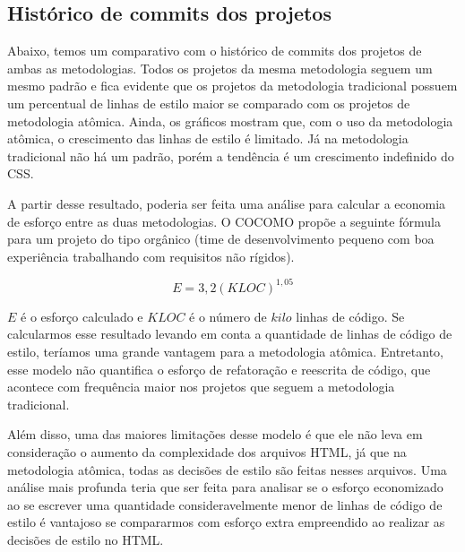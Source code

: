 \hypertarget{porcentagem de estilo}{%
\subsection{Histórico de commits dos projetos}\label{parcel}}

Abaixo, temos um comparativo com o histórico de commits dos projetos de ambas as metodologias. Todos os projetos da mesma metodologia seguem um mesmo padrão e fica evidente que os projetos da metodologia tradicional possuem um percentual de linhas de estilo maior se comparado com os projetos de metodologia atômica. Ainda, os gráficos mostram que, com o uso da metodologia atômica, o crescimento das linhas de estilo é limitado. Já na metodologia tradicional não há um padrão, porém a tendência é um crescimento indefinido do CSS.

A partir desse resultado, poderia ser feita uma análise para calcular a economia de esforço entre as duas metodologias. O COCOMO propõe a seguinte fórmula para um projeto do tipo orgânico (time de desenvolvimento pequeno com boa experiência trabalhando com requisitos não rígidos).

 \[E = 3,2(KLOC)^{1,05}\]

$E$ é o esforço calculado e $KLOC$ é o número de $kilo$ linhas de código. Se calcularmos esse resultado levando em conta a quantidade de linhas de código de estilo, teríamos uma grande vantagem para a metodologia atômica. Entretanto, esse modelo não quantifica o esforço de refatoração e reescrita de código, que acontece com frequência maior nos projetos que seguem a metodologia tradicional.

Além disso, uma das maiores limitações desse modelo é que ele não leva em consideração o aumento da complexidade dos arquivos HTML, já que na metodologia atômica, todas as decisões de estilo são feitas nesses arquivos. Uma análise mais profunda teria que ser feita para analisar se o esforço economizado ao se escrever uma quantidade consideravelmente menor de linhas de código de estilo é vantajoso se compararmos com esforço extra empreendido ao realizar as decisões de estilo no HTML.

